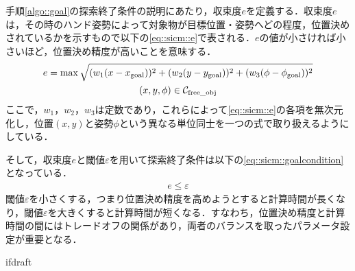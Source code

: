 \documentclass[a4paper,twoside,12pt,papersize, dvipdfmx]{iirthesis}
\begin{document}
手順\ref{algo::goal}の探索終了条件の説明にあたり，収束度$e$を定義する．収束度$e$は，その時のハンド姿勢によって対象物が目標位置・姿勢へどの程度，位置決めされているかを示すもので以下の\eqref{eq::sicm::e}で表される．$e$の値が小さければ小さいほど，位置決め精度が高いことを意味する．
\begin{gather}
e = \max \sqrt{(w_1(x-x_{\mathrm{goal}}))^2+(w_2(y-y_{\mathrm{goal}}))^2 + (w_3(\phi-\phi_{\mathrm{goal}}))^2}\label{eq::sicm::e} \\
(x, y, \phi) \in \mathcal{C}_{\mathrm{free\_obj}} \notag
\end{gather}
ここで，$w_1$，$w_2$，$w_3$は定数であり，これらによって\eqref{eq::sicm::e}の各項を無次元化し，位置$(x, y)$と姿勢$\phi$という異なる単位同士を一つの式で取り扱えるようにしている．\par
そして，収束度$e$と閾値$\varepsilon$を用いて探索終了条件は以下の\eqref{eq::sicm::goalcondition}となっている．
\begin{gather}
\label{eq::sicm::goalcondition}
e \leq \varepsilon 
\end{gather}
閾値$\varepsilon$を小さくする，つまり位置決め精度を高めようとすると計算時間が長くなり，閾値$\varepsilon$を大きくすると計算時間が短くなる．すなわち，位置決め精度と計算時間の間にはトレードオフの関係があり，両者のバランスを取ったパラメータ設定が重要となる．

\expandafter\ifx\csname ifdraft\endcsname\relax
    
\end{document}

